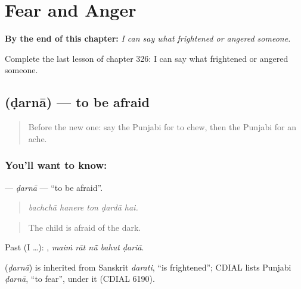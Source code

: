 
\chapter{Fear and Anger}
\label{ch:pa-a2-fear-and-anger}

\begin{chapteropening}
\textbf{By the end of this chapter:} \emph{I can say what frightened or angered someone.}

Complete the last lesson of chapter 326: I can say what frightened or angered someone.
\end{chapteropening}

\section[\texorpdfstring{\pa{ਡਰਨਾ} (ḍarnā)}{ਡਰਨਾ (ḍarnā)}]{ (ḍarnā) — to be afraid}

\label{lesson:PA-C326-darna}



\begin{quote}
Before the new one: say the Punjabi for to chew, then the Punjabi for an ache.
\end{quote}

\subsection*{You'll want to know: }
\textbf{} — \emph{ḍarnā} — \textquotedblleft{}to be afraid\textquotedblright{}.

\begin{quote}
    
\end{quote}

\begin{quote}
\emph{bachchā hanere ton ḍardā hai.}
\end{quote}

\begin{quote}
The child is afraid of the dark.
\end{quote}

Past (I …):     , \emph{maiṁ rāt nū̃ bahut ḍariā}.

\begin{cousinweb}
\textbf{} (\emph{ḍarnā}) is inherited from Sanskrit \emph{darati}, \textquotedblleft{}is frightened\textquotedblright{}; CDIAL lists Punjabi \emph{ḍarnā}, \textquotedblleft{}to fear\textquotedblright{}, under it (CDIAL 6190).
\end{cousinweb}

